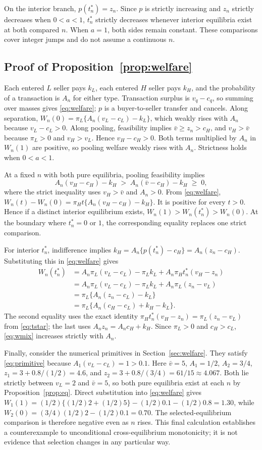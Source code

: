 \documentclass[11pt]{article}
\begin{document}
On the interior branch, $p(t_n^*)=z_n$. Since $p$ is strictly increasing and $z_n$ strictly decreases when $0<a<1$, $t_n^*$ strictly decreases whenever interior equilibria exist at both compared $n$. When $a=1$, both sides remain constant. These comparisons cover integer jumps and do not assume a continuous $n$.

\subsection{Proof of Proposition~\ref{prop:welfare}}\label{proof:welfare}
Each entered $L$ seller pays $k_L$, each entered $H$ seller pays $k_H$, and the probability of a transaction is $A_n$ for either type. Transaction surplus is $v_q-c_q$, so summing over masses gives \eqref{eq:welfare}; $p$ is a buyer-to-seller transfer and cancels. Along separation, $W_n(0)=\pi_L\{A_n(v_L-c_L)-k_L\}$, which weakly rises with $A_n$ because $v_L-c_L>0$. Along pooling, feasibility implies $\bar v\geq z_n>c_H$, and $v_H>\bar v$ because $\pi_L>0$ and $v_H>v_L$. Hence $v_H-c_H>0$. Both terms multiplied by $A_n$ in $W_n(1)$ are positive, so pooling welfare weakly rises with $A_n$. Strictness holds when $0<a<1$.

At a fixed $n$ with both pure equilibria, pooling feasibility implies
\[
 A_n(v_H-c_H)-k_H
 \;>\; A_n(\bar v-c_H)-k_H \;\geq\;0,
\]
where the strict inequality uses $v_H>\bar v$ and $A_n>0$. From \eqref{eq:welfare}, $W_n(t)-W_n(0)=\pi_Ht\{A_n(v_H-c_H)-k_H\}$. It is positive for every $t>0$. Hence if a distinct interior equilibrium exists, $W_n(1)>W_n(t_n^*)>W_n(0)$. At the boundary where $t_n^*=0$ or $1$, the corresponding equality replaces one strict comparison.

For interior $t_n^*$, indifference implies $k_H=A_n\{p(t_n^*)-c_H\}=A_n(z_n-c_H)$. Substituting this in \eqref{eq:welfare} gives
\begin{align*}
 W_n(t_n^*)
 &=A_n\pi_L(v_L-c_L)-\pi_Lk_L
   +A_n\pi_Ht_n^*(v_H-z_n)\\
 &=A_n\pi_L(v_L-c_L)-\pi_Lk_L
   +A_n\pi_L(z_n-v_L)\\
 &=\pi_L\{A_n(z_n-c_L)-k_L\}\\
 &=\pi_L\{A_n(c_H-c_L)+k_H-k_L\}.
\end{align*}
The second equality uses the exact identity $\pi_Ht_n^*(v_H-z_n)=\pi_L(z_n-v_L)$ from \eqref{eq:tstar}; the last uses $A_nz_n=A_nc_H+k_H$. Since $\pi_L>0$ and $c_H>c_L$, \eqref{eq:wmix} increases strictly with $A_n$.

Finally, consider the numerical primitives in Section~\ref{sec:welfare}. They satisfy \eqref{eq:primitive} because $A_1(v_L-c_L)=1>0.1$. Here $\bar v=5$, $A_1=1/2$, $A_2=3/4$, $z_1=3+0.8/(1/2)=4.6$, and $z_2=3+0.8/(3/4)=61/15\approx4.067$. Both lie strictly between $v_L=2$ and $\bar v=5$, so both pure equilibria exist at each $n$ by Proposition~\ref{prop:eq}. Direct substitution into \eqref{eq:welfare} gives $W_1(1)=(1/2)\{(1/2)2+(1/2)5\}-(1/2)0.1-(1/2)0.8=1.30$, while $W_2(0)=(3/4)(1/2)2-(1/2)0.1=0.70$. The selected-equilibrium comparison is therefore negative even as $n$ rises. This final calculation establishes a counterexample to unconditional cross-equilibrium monotonicity; it is not evidence that selection changes in any particular way.
\end{document}
